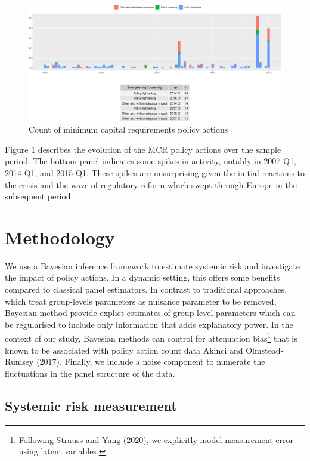 \documentclass[
  10pt,
]{article}
\begin{document}
\begin{figure}[H]
\includegraphics{figures/paper-fig1-1} \caption{Count of minimum capital requirements policy actions}\label{fig:fig1}
\end{figure}

Figure 1 describes the evolution of the MCR policy actions over the
sample period. The bottom panel indicates some spikes in activity,
notably in 2007 Q1, 2014 Q1, and 2015 Q1. These spikes are unsurprising
given the initial reactions to the crisis and the wave of regulatory
reform which swept through Europe in the subsequent period.

\hypertarget{meth}{%
\section{Methodology}\label{meth}}

We use a Bayesian inference framework to estimate systemic risk and
investigate the impact of policy actions. In a dynamic setting, this
offers some benefits compared to classical panel estimators. In contrast
to traditional approaches, which treat group-levels parameters as
nuisance parameter to be removed, Bayesian method provide explict
estimates of group-level parameters which can be regularised to include
only information that adds explanatory power. In the context of our
study, Bayesian methods can control for attenuation bias\footnote{Following
  Strauss and Yang (2020), we explicitly model measurement error using
  latent variables.} that is known to be associated with policy action
count data Akinci and Olmstead-Rumsey (2017). Finally, we include a
noise component to numerate the fluctuations in the panel structure of
the data.

\hypertarget{systemic-risk-measurement}{%
\subsection{Systemic risk measurement}\label{systemic-risk-measurement}}
\end{document}
